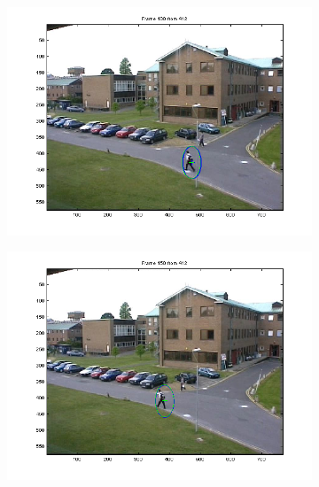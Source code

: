 \documentclass[hyperref={pdfpagelabels=false}]{beamer}
\begin{document}
\begin{frame}
\begin{figure}
\begin{subfigure}[b]{0.3\textwidth}
                 \includegraphics[width=\textwidth]{results/PETS01D1Human1man/Frame0100.png}
         \end{subfigure}
         \begin{subfigure}[b]{0.3\textwidth}
                 \includegraphics[width=\textwidth]{results/PETS01D1Human1man/Frame0150.png}
         \end{subfigure}
\end{figure}         

\end{frame}
\end{document}
